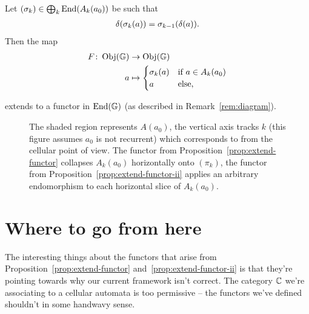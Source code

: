 \documentclass[11pt,a4paper]{amsart}
\begin{document}
\begin{PROP}
  \label{prop:extend-functor-ii}
  Let $(\sigma_k) \in \bigoplus_k \operatorname{End}(A_k(a_0))$ be such that
  \begin{align*}
    \delta(\sigma_k(a)) = \sigma_{k-1}(\delta(a)).
  \end{align*}
  Then the map 
  \begin{align*}
    F \colon \operatorname{Obj}(\mathbb{G}) &\to \operatorname{Obj}(\mathbb{G})\\
    a &\mapsto 
        \begin{cases}
          \sigma_k(a) &\text{if $a \in A_k(a_0)$}\\
          a &\text{else,}
        \end{cases}
  \end{align*} 
\end{PROP}
extends to a functor in $\operatorname{End}(\mathbb{G})$ (as described in Remark~\ref{rem:diagram}).
\begin{figure}[h]
  \caption[b]{The shaded region represents $A(a_0)$, the vertical axis tracks $k$ (this figure assumes $a_0$ is not recurrent) which corresponds to  from the cellular point of view. The functor from Proposition~\ref{prop:extend-functor} collapses $A_k(a_0)$ horizontally onto $(\pi_k)$, the functor from Proposition~\ref{prop:extend-functor-ii} applies an arbitrary endomorphism to each horizontal slice of $A_k(a_0)$.}
\end{figure}
\section{Where to go from here} \label{sec:where-to-go}

The interesting things about the functors that arise from Proposition~\ref{prop:extend-functor} and~\ref{prop:extend-functor-ii} is that they're pointing towards why our current framework isn't correct. The category $\mathbb{C}$ we're associating to a cellular automata is too permissive -- the functors we've defined shouldn't  in some handwavy sense. 
\end{document}
